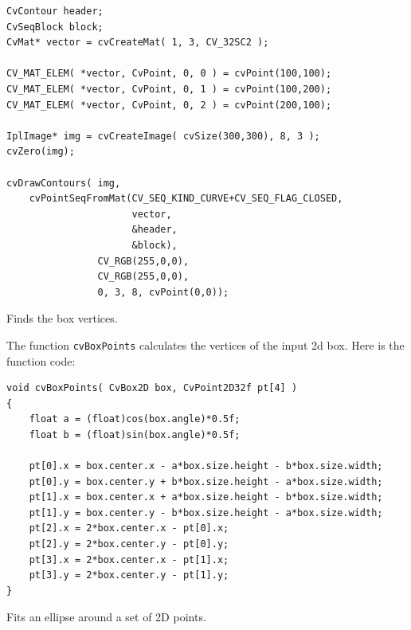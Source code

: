 \begin{lstlisting}
CvContour header;
CvSeqBlock block;
CvMat* vector = cvCreateMat( 1, 3, CV_32SC2 );

CV_MAT_ELEM( *vector, CvPoint, 0, 0 ) = cvPoint(100,100);
CV_MAT_ELEM( *vector, CvPoint, 0, 1 ) = cvPoint(100,200);
CV_MAT_ELEM( *vector, CvPoint, 0, 2 ) = cvPoint(200,100);

IplImage* img = cvCreateImage( cvSize(300,300), 8, 3 );
cvZero(img);

cvDrawContours( img,
    cvPointSeqFromMat(CV_SEQ_KIND_CURVE+CV_SEQ_FLAG_CLOSED,
                      vector,
                      &header,
                      &block),
                CV_RGB(255,0,0),
                CV_RGB(255,0,0),
                0, 3, 8, cvPoint(0,0));
\end{lstlisting}
\fi

\label{BoxPoints}

Finds the box vertices.


\begin{description}
\end{description}

The function \texttt{cvBoxPoints} calculates the vertices of the input 2d box. Here is the function code:

\begin{lstlisting}
void cvBoxPoints( CvBox2D box, CvPoint2D32f pt[4] )
{
    float a = (float)cos(box.angle)*0.5f;
    float b = (float)sin(box.angle)*0.5f;

    pt[0].x = box.center.x - a*box.size.height - b*box.size.width;
    pt[0].y = box.center.y + b*box.size.height - a*box.size.width;
    pt[1].x = box.center.x + a*box.size.height - b*box.size.width;
    pt[1].y = box.center.y - b*box.size.height - a*box.size.width;
    pt[2].x = 2*box.center.x - pt[0].x;
    pt[2].y = 2*box.center.y - pt[0].y;
    pt[3].x = 2*box.center.x - pt[1].x;
    pt[3].y = 2*box.center.y - pt[1].y;
}
\end{lstlisting}

\label{FitEllipse}

Fits an ellipse around a set of 2D points.


